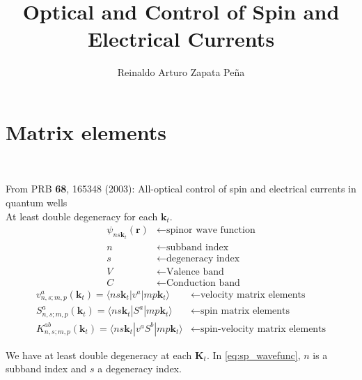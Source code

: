 \documentclass{article}
\title{Optical and Control of Spin and Electrical Currents}
\author{Reinaldo Arturo Zapata Pe\~na}
\date{}
\begin{document}
\maketitle

\section{Matrix elements}

\


From PRB \textbf{68}, 165348 (2003): All-optical control of spin and electrical
currents in quantum wells
\\

At least double degeneracy for each $\mathbf{k}_{t}$.
\begin{align}
\psi_{ns\mathbf{k}_{t}}(\mathbf{r})  & \leftarrow \text{spinor wave function} \label{eq:sp_wavefunc} \\
n & \leftarrow  \text{subband index} \nonumber \\
s & \leftarrow  \text{degeneracy index} \nonumber \\
V & \leftarrow  \text{Valence band} \nonumber \\
C & \leftarrow  \text{Conduction band} \nonumber
\end{align}
\begin{align*}
v_{n,s;m,p}^{a}(\mathbf{k}_{t}) = \langle ns\mathbf{k}_{t} | v^{a} |
mp\mathbf{k}_{t} \rangle & \leftarrow \text{velocity matrix elements}\\
S_{n,s;m,p}^{a}(\mathbf{k}_{t}) = \langle ns\mathbf{k}_{t} | S^{a} |
mp\mathbf{k}_{t} \rangle & \leftarrow \text{spin matrix elements}\\
K_{n,s;m,p}^{ab}(\mathbf{k}_{t})= \langle ns\mathbf{k}_{t} | v^{a}S^{b} |
mp\mathbf{k}_{t} \rangle & \leftarrow \text{spin-velocity matrix elements}
\end{align*}

We have at least double degeneracy at each $\mathbf{K}_{t}$. In \eqref{eq:sp_wavefunc}, $n$ is a subband index and $s$ a degeneracy index.

\end{document}

